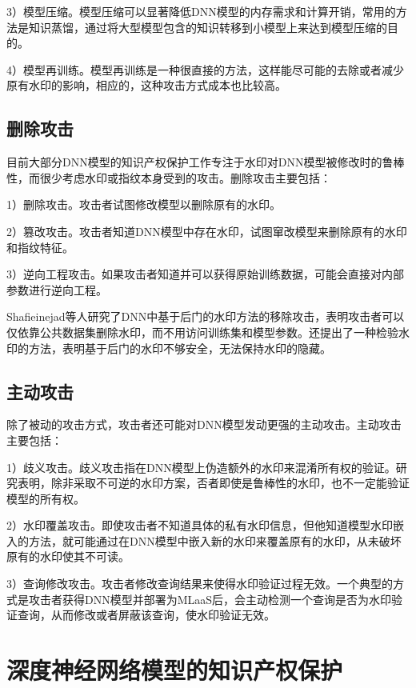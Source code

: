 3）模型压缩。模型压缩可以显著降低DNN模型的内存需求和计算开销，常用的方法是知识蒸馏，通过将大型模型包含的知识转移到小模型上来达到模型压缩的目的。
	
4）模型再训练\cite{namba2019robust}。模型再训练是一种很直接的方法，这样能尽可能的去除或者减少原有水印的影响，相应的，这种攻击方式成本也比较高。


\subsection{删除攻击}

目前大部分DNN模型的知识产权保护工作专注于水印对DNN模型被修改时的鲁棒性，而很少考虑水印或指纹本身受到的攻击。删除攻击主要包括：

1）删除攻击\cite{shafieinejad2021robustness}。攻击者试图修改模型以删除原有的水印。

2）篡改攻击。攻击者知道DNN模型中存在水印，试图窜改模型来删除原有的水印和指纹特征。

3）逆向工程攻击\cite{fan2019rethinking}。如果攻击者知道并可以获得原始训练数据，可能会直接对内部参数进行逆向工程。


Shafieinejad等人\cite{shafieinejad2021robustness}研究了DNN中基于后门的水印方法的移除攻击，表明攻击者可以仅依靠公共数据集删除水印，而不用访问训练集和模型参数。还提出了一种检验水印的方法，表明基于后门的水印不够安全，无法保持水印的隐藏。


\subsection{主动攻击}

除了被动的攻击方式，攻击者还可能对DNN模型发动更强的主动攻击。主动攻击主要包括：

1）歧义攻击。歧义攻击指在DNN模型上伪造额外的水印来混淆所有权的验证。研究表明，除非采取不可逆的水印方案，否者即使是鲁棒性的水印，也不一定能验证模型的所有权\cite{fan2019rethinking}。

2）水印覆盖攻击\cite{darvish2019deepsigns, chen2019blackmarks, chen2019deepmarks}。即使攻击者不知道具体的私有水印信息，但他知道模型水印嵌入的方法，就可能通过在DNN模型中嵌入新的水印来覆盖原有的水印，从未破坏原有的水印使其不可读。

3）查询修改攻击。攻击者修改查询结果来使得水印验证过程无效。一个典型的方式是攻击者获得DNN模型并部署为MLaaS后，会主动检测一个查询是否为水印验证查询，从而修改或者屏蔽该查询，使水印验证无效。



\section{深度神经网络模型的知识产权保护}

